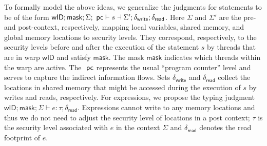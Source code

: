 
To formally model the above ideas, we generalize the judgments for statements to be of the form
$\mathsf{wID}; \mathsf{mask};\Sigma; ~\mathsf{pc} \vdash s  \dashv \Sigma'; \delta_\mathsf{write}; \delta_\mathsf{read}$.
%
Here $\Sigma$ and $\Sigma'$ are the pre- and post-context, respectively, mapping local variables, shared memory, and global memory locations to security levels.
%
They correspond, respectively, to the security levels before and after the execution of the statement $s$ by threads that are in warp $\mathsf{wID}$ and satisfy $\mathsf{mask}$.
The mask $\mathsf{mask}$ indicates which threads within the warp are active.
The $~\mathsf{pc}$ represents the usual ``program counter'' level and serves to capture the indirect information flows.
Sets $\delta_\mathsf{write}$ and  $\delta_{\mathsf{read}}$ collect the locations in shared memory that might be accessed during the execution of $s$ by writes and reads, respectively.
%
For expressions, we propose the  typing judgment $\mathsf{wID}; \mathsf{mask};\Sigma \vdash e: \tau; \delta_{\mathsf{read}}$.  Expressions cannot write to any memory locations and thus we do not need to adjust the security level of  locations in a post context; $\tau$ is the security level associated with $e$ in the context $\Sigma$ and $\delta_{\mathsf{read}}$ denotes the read footprint of $e$.


%

%
%
% 
%
%

%
%

